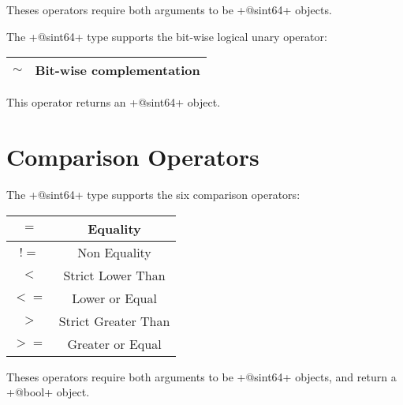 Theses operators require both arguments to be \ggst+@sint64+ objects.\newline


The \ggst+@sint64+ type supports the bit-wise logical unary operator:\newline

\begin{tabular}{|c|c|}
\hline
$\sim$ & Bit-wise complementation \\
\hline
\end{tabular}

This operator returns an \ggst+@sint64+ object.







\section{Comparison Operators}

The \ggst+@sint64+ type supports the six comparison operators:\newline

\begin{tabular}{|c|c|}
\hline
$=$ & Equality \\
\hline
$!=$ & Non Equality \\
\hline
$<$  & Strict Lower Than \\
\hline
$<=$  & Lower or Equal \\
\hline
$>$  & Strict Greater Than \\
\hline
$>=$  & Greater or Equal \\
\hline
\end{tabular}

Theses operators require both arguments to be \ggst+@sint64+ objects, and return a \ggst+@bool+ object.


